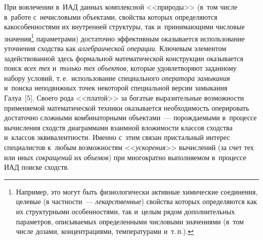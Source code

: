 \begin{multicols}{2}
    При вовлечении в~ИАД данных комплексной <<природы>> (в~том 
числе в~работе с~нечисловыми объектами, свойства которых определяются 
как\linebreak особенностями их внутренней структуры, так и~принимающими 
чис\-ло\-вые значения\footnote[4]{Например, это могут быть физиологически активные 
химические соединения, целевые (в частности~--- \textit{лекарственные}) свойства которых 
определяются как их структурными особенностями, так и~целым рядом дополнительных 
па\-ра\-мет\-ров, описываемых определенными числовыми значениями (в~том числе  дозами, 
концентрациями, температурами и~т.\,п.).} па\-ра\-мет\-рами) достаточно эффективным 
оказывается использование уточнения сходства как \textit{алгебраической 
операции}. Ключевым элементом задействованной здесь формальной 
математической конструкции оказывается поиск \textit{всех тех} 
и~\textit{только тех \mbox{объектов}}, которые удовлетворяют заданному набору 
условий, т.\,е.\ использование специального \textit{оператора замыкания} 
и~поиска неподвижных точек некоторой специальной версии замыкания 
Галуа~[5]. Своего рода <<платой>> за богатые выразительные возможности 
применяемой математической техники оказывается необходимость 
оперировать достаточно сложными комбинаторными объектами~--- 
по\-рож\-да\-емы\-ми в~процессе вычисления сходств диаграммами взаимной 
вложимости классов сходства и~классов эквивалентности. Именно с~этим 
связан пристальный интерес специалистов к~любым возможностям 
<<\textit{ускорения}>> вычислений (за счет тех или иных \textit{сокращений} их 
\textit{объемов}) при многократно выполняемом в~процессе ИАД поиске 
сходств.
    

\end{multicols}
